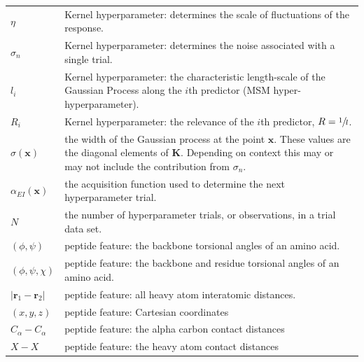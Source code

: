 \begin{table}
\begin{tabularx}{0.9\textwidth}{ |l| >{\raggedright\arraybackslash}X | }
        $\eta$ & Kernel hyperparameter: determines the scale of fluctuations of the response. \\
        $\sigma_{n}$ & Kernel hyperparameter: determines the noise associated with a single trial. \\
        $l_{i}$ & Kernel hyperparameter: the characteristic length-scale of the Gaussian Process 
                along the $i$th predictor (MSM hyper-hyperparameter).\\
        $R_{i}$ & Kernel hyperparameter: the relevance of the $i$th predictor, $R=\sfrac{1}{l}$. \\ 
        $\sigma(\mathbf{x})$ & the width of the Gaussian process at the point $\mathbf{x}$. These values  are the diagonal elements of $\mathbf{K}$. Depending on context this may or may not include the contribution from $\sigma_{n}$. \\
        $\alpha_{EI}(\mathbf{x})$ & the acquisition function used to determine the next hyperparameter trial. \\
        $N$ & the number of hyperparameter trials, or observations,  in a trial data set.\\
        $(\phi, \psi)$ & peptide feature: the backbone torsional angles of an amino acid.  \\
        $(\phi, \psi, \chi)$ & peptide feature: the backbone and residue torsional angles of an amino acid. \\
        $|\mathbf{r}_{1}-\mathbf{r}_{2}|$ & peptide feature: all heavy atom interatomic distances.  \\
        $(x, y, z)$ & peptide feature: Cartesian coordinates \\
        $C_{\alpha}-C_{\alpha}$ & peptide feature: the alpha carbon contact distances \\
        $X-X$ & peptide feature: the heavy atom contact distances \\
     \hline
     \end{tabularx}
    \label{tab:msm_symbols}
\end{table}

